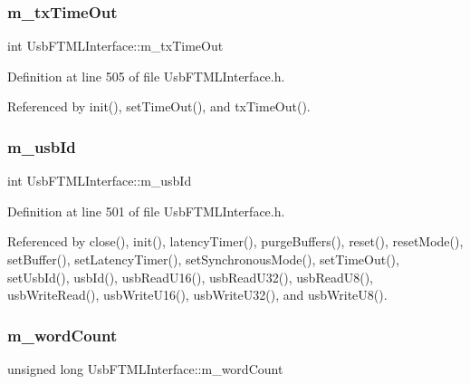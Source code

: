 \subsubsection{\texorpdfstring{m\+\_\+tx\+Time\+Out}{m\_txTimeOut}}
{\footnotesize\ttfamily int Usb\+F\+T\+M\+L\+Interface\+::m\+\_\+tx\+Time\+Out\hspace{0.3cm}{\ttfamily [private]}}



Definition at line 505 of file Usb\+F\+T\+M\+L\+Interface.\+h.



Referenced by init(), set\+Time\+Out(), and tx\+Time\+Out().

\mbox{\label{classUsbFTMLInterface_aab6754587c303660d5c498ce34a2b4c8}} 
\subsubsection{\texorpdfstring{m\+\_\+usb\+Id}{m\_usbId}}
{\footnotesize\ttfamily int Usb\+F\+T\+M\+L\+Interface\+::m\+\_\+usb\+Id\hspace{0.3cm}{\ttfamily [private]}}



Definition at line 501 of file Usb\+F\+T\+M\+L\+Interface.\+h.



Referenced by close(), init(), latency\+Timer(), purge\+Buffers(), reset(), reset\+Mode(), set\+Buffer(), set\+Latency\+Timer(), set\+Synchronous\+Mode(), set\+Time\+Out(), set\+Usb\+Id(), usb\+Id(), usb\+Read\+U16(), usb\+Read\+U32(), usb\+Read\+U8(), usb\+Write\+Read(), usb\+Write\+U16(), usb\+Write\+U32(), and usb\+Write\+U8().

\mbox{\label{classUsbFTMLInterface_ab7f4399ef367c08ffe1f7034f133986e}} 
\subsubsection{\texorpdfstring{m\+\_\+word\+Count}{m\_wordCount}}
{\footnotesize\ttfamily unsigned long Usb\+F\+T\+M\+L\+Interface\+::m\+\_\+word\+Count\hspace{0.3cm}{\ttfamily [private]}}



